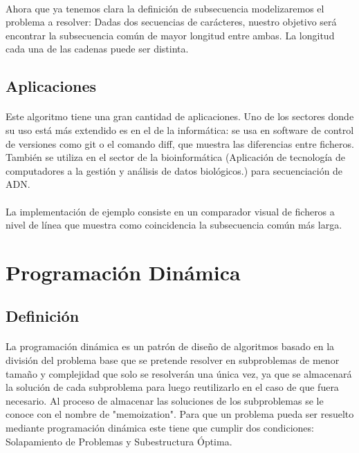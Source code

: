 \documentclass{article}
\begin{document}
		\paragraph{}
		Ahora que ya tenemos clara la definición de subsecuencia modelizaremos el problema a resolver:
		\newline
		Dadas dos secuencias de carácteres, nuestro objetivo será encontrar la subsecuencia común de mayor longitud entre ambas. La longitud cada una de las cadenas puede ser distinta.

	\subsection{Aplicaciones}
		\paragraph{}
		Este algoritmo tiene una gran cantidad de aplicaciones. Uno de los sectores donde su uso está más extendido es en el de la informática: se usa en software de control de versiones como git o el comando diff, que muestra las diferencias entre ficheros. También se utiliza en el sector de la bioinformática (Aplicación de tecnología de computadores a la gestión y análisis de datos biológicos.) para secuenciación de ADN.
		
		\paragraph{}
		La implementación de ejemplo consiste en un comparador visual de ficheros a nivel de línea que muestra como coincidencia la subsecuencia común más larga.

\section{Programación Dinámica}
	\subsection{Definición}
		\paragraph{}
		La programación dinámica es un patrón de diseño de algoritmos basado en la división del problema base que se pretende resolver en subproblemas de menor tamaño y complejidad que solo se resolverán una única vez, ya que se almacenará la solución de cada subproblema para luego reutilizarlo en el caso de que fuera necesario. Al proceso de almacenar las soluciones de los subproblemas se le conoce con el nombre de "memoization". Para que un problema pueda ser resuelto mediante programación dinámica este tiene que cumplir dos condiciones: Solapamiento de Problemas y Subestructura Óptima.
\end{document}
